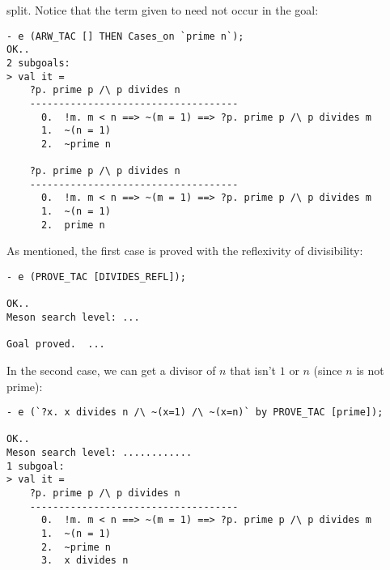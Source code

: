 split. Notice that the term given to  need not occur in
the goal:
\begin{session}\begin{verbatim}
- e (ARW_TAC [] THEN Cases_on `prime n`);
OK..
2 subgoals:
> val it =
    ?p. prime p /\ p divides n
    ------------------------------------
      0.  !m. m < n ==> ~(m = 1) ==> ?p. prime p /\ p divides m
      1.  ~(n = 1)
      2.  ~prime n

    ?p. prime p /\ p divides n
    ------------------------------------
      0.  !m. m < n ==> ~(m = 1) ==> ?p. prime p /\ p divides m
      1.  ~(n = 1)
      2.  prime n
\end{verbatim}\end{session}
\noindent As mentioned, the first case is proved with the reflexivity of
divisibility:
\begin{session}\begin{verbatim}
- e (PROVE_TAC [DIVIDES_REFL]);

OK..
Meson search level: ...

Goal proved.  ...
\end{verbatim}\end{session}
\noindent
In the second case, we can get a divisor of $n$ that isn't $1$ or $n$
(since $n$ is not prime):
\begin{session}\begin{verbatim}
- e (`?x. x divides n /\ ~(x=1) /\ ~(x=n)` by PROVE_TAC [prime]);

OK..
Meson search level: ............
1 subgoal:
> val it =
    ?p. prime p /\ p divides n
    ------------------------------------
      0.  !m. m < n ==> ~(m = 1) ==> ?p. prime p /\ p divides m
      1.  ~(n = 1)
      2.  ~prime n
      3.  x divides n
      4.  ~(x = 1)
      5.  ~(x = n)
\end{verbatim}\end{session}
At this point, the polished tactic simply invokes  with
a collection of theorems. We will attempt a more detailed
exposition. Given the hypotheses, and by {\small\it DIVIDES\_LE}, we can
assert $x < n \lor n = 0$ and thus split the proof into two cases:
\begin{session}\begin{verbatim}
- e (`x < n \/ (n=0)` by PROVE_TAC [DIVIDES_LE,LESS_OR_EQ]);

OK..
Meson search level: ......
2 subgoals:
> val it =
    ?p. prime p /\ p divides n
    ------------------------------------
      0.  !m. m < n ==> ~(m = 1) ==> ?p. prime p /\ p divides m
      1.  ~(n = 1)
      2.  ~prime n
      3.  x divides n
      4.  ~(x = 1)
      5.  ~(x = n)
      6.  n = 0

    ?p. prime p /\ p divides n
    ------------------------------------
      0.  !m. m < n ==> ~(m = 1) ==> ?p. prime p /\ p divides m
      1.  ~(n = 1)
      2.  ~prime n
      3.  x divides n
      4.  ~(x = 1)
      5.  ~(x = n)
      6.  x < n
\end{verbatim}\end{session}
